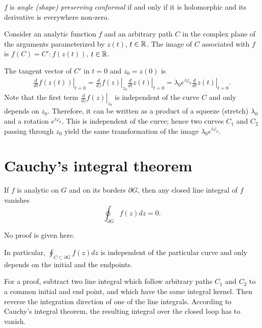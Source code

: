 $f$
is
{\em angle (shape)  preserving}
{\em conformal} if and only if it is holomorphic and its derivative is everywhere non-zero.

 {\color{OliveGreen}
\bproof

Consider an analytic function $f$ and an arbitrary path $C$ in the complex plane of the arguments parameterized
by $z(t)$, $t\in {\Bbb R}$.
The image of $C$ associated with $f$ is  $f(C) = C': f(z(t))$, $t\in {\Bbb R}$.

The tangent vector of $C'$ in $t=0$ and $z_0=z(0)$ is
\begin{equation}
\begin{split}
\left. \frac{d }{dt} f(z(t))\right|_{t=0}
=
\left. \frac{d }{dz} f(z)\right|_{z_0}
\left. \frac{d }{dt} z(t)\right|_{t=0}
=
\lambda_0
e^{i\varphi_0}
\left. \frac{d }{dt} z(t)\right|_{t=0} .
\end{split}
\end{equation}
Note that the first term $\left. \frac{d }{dz} f(z)\right|_{z_0}$
is independent of the curve $C$ and only depends on $z_0$.
Therefore, it can be written as a product of a  squeeze (stretch) $\lambda_0 $
and a rotation $e^{i\varphi_0}$.
This is independent of the curve; hence
two curves $C_1$ and $C_2$ passing through $z_0$ yield the same
transformation of the image $\lambda_0
e^{i\varphi_0}$.
\eproof
}






 \section{Cauchy's integral theorem}
 If $f$ is analytic on $G$ and on its borders $\partial G$, then any closed line integral of $f$ vanishes
 \begin{equation}
\oint_{\partial G}f(z)dz=0
.
\label{2018-m-ch-ca-cit}
\end{equation}

No proof is given here.



In particular,
 $\oint_{C\subset \partial G}f(z)dz
$ is independent of the particular curve and only depends on the initial and the endpoints.

 {\color{OliveGreen}
\bproof
 For a proof, subtract two line integral which follow arbitrary paths  $C_1$ and $C_2$ to a common initial and end point,
and which have the same integral kernel.
Then reverse the integration direction of one of the line integrals.
According to Cauchy's integral theorem, the resulting integral over the closed loop has to vanish.
\eproof
}

